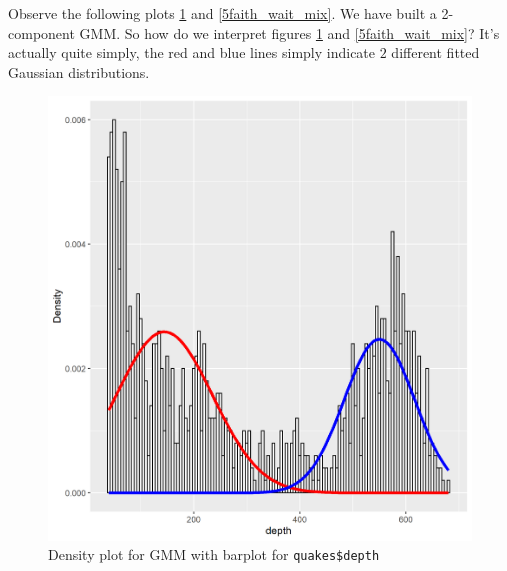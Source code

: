 Observe the following plots \ref{5quakes_depth_mix} and \ref{5faith_wait_mix}. We have built a 2-component GMM. So how do we interpret figures \ref{5quakes_depth_mix} and \ref{5faith_wait_mix}? It’s actually quite simply, the red and blue lines simply indicate $2$ different fitted Gaussian distributions.
\begin{figure}[h]
\centering
\includegraphics[scale=0.75, keepaspectratio]{ex5/5quakes_depth_mix.png}
\caption{Density plot for  GMM with barplot for \texttt{quakes\$depth}}
\label{5quakes_depth_mix}
\end{figure} 


